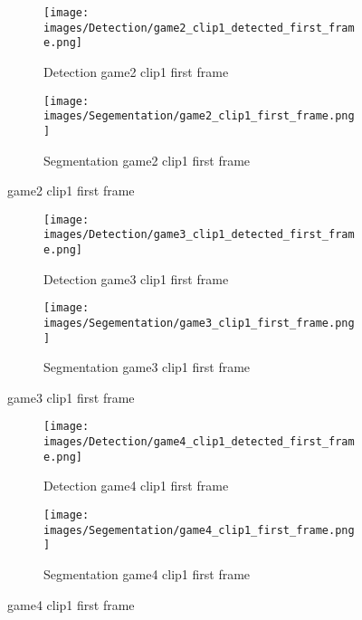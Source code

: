 \begin{figure}
    \centering
    \begin{subfigure}[b]{0.45\textwidth}
        \centering
        \texttt{[image: images/Detection/game2\_clip1\_detected\_first\_frame.png]}
        \caption{Detection game2 clip1 first frame}
        \label{fig: game2_clip1_first_frame_detected}
    \end{subfigure}
    \begin{subfigure}[b]{0.45\textwidth}
        \centering
        \texttt{[image: images/Segementation/game2\_clip1\_first\_frame.png]}
        \caption{Segmentation game2 clip1 first frame}
		\label{fig: game2_clip1_first_frame_segmented}
    \end{subfigure}
	\caption{game2 clip1 first frame}
\end{figure}

\begin{figure}
    \centering
    \begin{subfigure}[b]{0.45\textwidth}
        \centering
        \texttt{[image: images/Detection/game3\_clip1\_detected\_first\_frame.png]}
        \caption{Detection game3 clip1 first frame}
        \label{fig: game3_clip1_first_frame_detected}
    \end{subfigure}
    \begin{subfigure}[b]{0.45\textwidth}
        \centering
        \texttt{[image: images/Segementation/game3\_clip1\_first\_frame.png]}
        \caption{Segmentation game3 clip1 first frame}
		\label{fig: game3_clip1_first_frame_segmented}
    \end{subfigure}
	\caption{game3 clip1 first frame}
\end{figure}

\begin{figure}
    \centering
    \begin{subfigure}[b]{0.45\textwidth}
        \centering
        \texttt{[image: images/Detection/game4\_clip1\_detected\_first\_frame.png]}
        \caption{Detection game4 clip1 first frame}
        \label{fig: game4_clip1_first_frame_detected}
    \end{subfigure}
    \begin{subfigure}[b]{0.45\textwidth}
        \centering
        \texttt{[image: images/Segementation/game4\_clip1\_first\_frame.png]}
        \caption{Segmentation game4 clip1 first frame}
		\label{fig: game4_clip1_first_frame_segmented}
    \end{subfigure}
	\caption{game4 clip1 first frame}
\end{figure}
